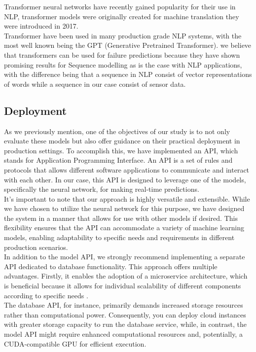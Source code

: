 \documentclass{article}
\begin{document}
Transformer neural networks have recently gained popularity for their use in NLP, transformer models were originally created for machine translation they were introduced in 2017. \cite{Vaswani2017} \\

Transformer have been used in many production grade NLP systems, with the most well known being the GPT (Generative Pretrained Transformer). we believe that transformers can be used for failure predictions because they have shown promising results for Sequence modelling as is the case with NLP applications, with the difference being that a sequence in NLP consist of vector representations of words while a sequence in our case consist of sensor data.


\subsection{Deployment}
As we previously mention, one of the objectives of our study is to not only evaluate these models but also offer guidance on their practical deployment in production settings. To accomplish this, we have implemented an API, which stands for Application Programming Interface. An API is a set of rules and protocols that allows different software applications to communicate and interact with each other. In our case, this API is designed to leverage one of the models, specifically the neural network, for making real-time predictions.\\

It's important to note that our approach is highly versatile and extensible. While we have chosen to utilize the neural network for this purpose, we have designed the system in a manner that allows for use with other models if desired. This flexibility ensures that the API can accommodate a variety of machine learning models, enabling adaptability to specific needs and requirements in different production scenarios.\\

In addition to the model API, we strongly recommend implementing a separate API dedicated to database functionality. This approach offers multiple advantages. Firstly, it enables the adoption of a microservice architecture, which is beneficial because it allows for individual scalability of different components according to specific needs \cite{Patel2021}. \\

The database API, for instance, primarily demands increased storage resources rather than computational power. Consequently, you can deploy cloud instances with greater storage capacity to run the database service, while, in contrast, the model API might require enhanced computational resources and, potentially, a CUDA-compatible GPU for efficient execution.\\
\end{document}
